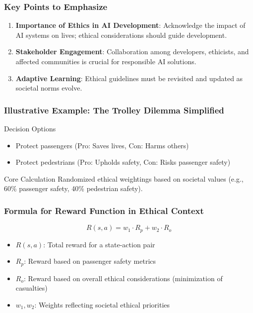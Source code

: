 \documentclass[aspectratio=169]{beamer}
\begin{document}
\begin{frame}[fragile]
    \frametitle{Key Points to Emphasize}
    
    \begin{enumerate}
        \item \textbf{Importance of Ethics in AI Development}: Acknowledge the impact of AI systems on lives; ethical considerations should guide development.
        \item \textbf{Stakeholder Engagement}: Collaboration among developers, ethicists, and affected communities is crucial for responsible AI solutions.
        \item \textbf{Adaptive Learning}: Ethical guidelines must be revisited and updated as societal norms evolve.
    \end{enumerate}
\end{frame}

\begin{frame}[fragile]
    \frametitle{Illustrative Example: The Trolley Dilemma Simplified}
    
    \begin{block}{Decision Options}
        \begin{itemize}
            \item Protect passengers (Pro: Saves lives, Con: Harms others)
            \item Protect pedestrians (Pro: Upholds safety, Con: Risks passenger safety)
        \end{itemize}
    \end{block}
    
    \begin{block}{Core Calculation}
        Randomized ethical weightings based on societal values (e.g., 60\% passenger safety, 40\% pedestrian safety).
    \end{block}
\end{frame}

\begin{frame}[fragile]
    \frametitle{Formula for Reward Function in Ethical Context}
    
    \begin{equation}
        R(s, a) = w_1 \cdot R_p + w_2 \cdot R_o
    \end{equation}
    
    \begin{itemize}
        \item \( R(s, a) \): Total reward for a state-action pair
        \item \( R_p \): Reward based on passenger safety metrics
        \item \( R_o \): Reward based on overall ethical considerations (minimization of casualties)
        \item \( w_1, w_2 \): Weights reflecting societal ethical priorities
    \end{itemize}
\end{frame}
\end{document}

